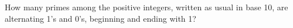 How many primes among the positive integers, written as usual in base 10,
are alternating 1's and 0's, beginning and ending with 1?
